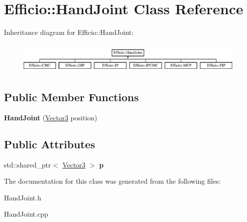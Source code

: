 \hypertarget{class_efficio_1_1_hand_joint}{}\section{Efficio\+:\+:Hand\+Joint Class Reference}
\label{class_efficio_1_1_hand_joint}
Inheritance diagram for Efficio\+:\+:Hand\+Joint\+:\begin{figure}[H]
\begin{center}
\leavevmode
\includegraphics[height=1.568627cm]{class_efficio_1_1_hand_joint}
\end{center}
\end{figure}
\subsection*{Public Member Functions}
\begin{DoxyCompactItemize}
\item 
{\bfseries Hand\+Joint} (\hyperlink{class_efficio_1_1_vector3}{Vector3} position)\hypertarget{class_efficio_1_1_hand_joint_a29681e05e25bc27a4c36c91476529305}{}\label{class_efficio_1_1_hand_joint_a29681e05e25bc27a4c36c91476529305}

\end{DoxyCompactItemize}
\subsection*{Public Attributes}
\begin{DoxyCompactItemize}
\item 
std\+::shared\+\_\+ptr$<$ \hyperlink{class_efficio_1_1_vector3}{Vector3} $>$ {\bfseries p}\hypertarget{class_efficio_1_1_hand_joint_a29175266d437a02416c864a017fc27d5}{}\label{class_efficio_1_1_hand_joint_a29175266d437a02416c864a017fc27d5}

\end{DoxyCompactItemize}


The documentation for this class was generated from the following files\+:\begin{DoxyCompactItemize}
\item 
Hand\+Joint.\+h\item 
Hand\+Joint.\+cpp\end{DoxyCompactItemize}
